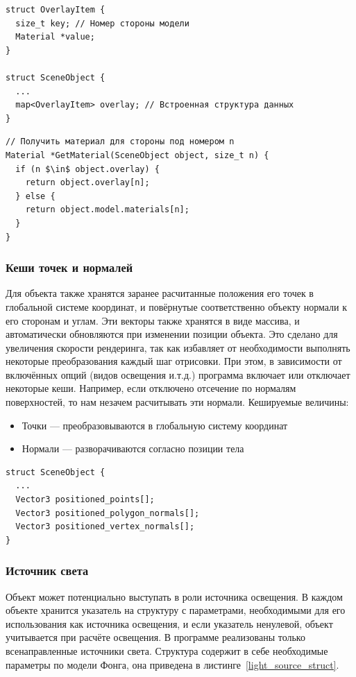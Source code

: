 \documentclass[a4paper,12pt]{report}
\numberwithin{equation}{section}
\begin{document}
\begin{lstlisting}[float=p,caption={Структура данных ``Оверлей материалов''},label=overlay_struct]
struct OverlayItem {
  size_t key; // Номер стороны модели
  Material *value;
}

struct SceneObject {
  ...
  map<OverlayItem> overlay; // Встроенная структура данных
}
\end{lstlisting}

\begin{lstlisting}[float=p,caption={Использование оверлея},label=overlay_use]
// Получить материал для стороны под номером n
Material *GetMaterial(SceneObject object, size_t n) {
  if (n $\in$ object.overlay) {
    return object.overlay[n];
  } else {
    return object.model.materials[n];
  }
}
\end{lstlisting}

\subsubsection{Кеши точек и нормалей}
Для объекта также хранятся заранее расчитанные положения его точек в глобальной системе координат, и повёрнутые соответственно объекту нормали к его сторонам и углам. Эти векторы также хранятся в виде массива, и автоматически обновляются при изменении позиции объекта. Это сделано для увеличения скорости рендеринга, так как избавляет от необходимости выполнять некоторые преобразования каждый шаг отрисовки. При этом, в зависимости от включённых опций (видов освещения и.т.д.) программа включает или отключает некоторые кеши. Например, если отключено отсечение по нормалям поверхностей, то нам незачем расчитывать эти нормали. Кешируемые величины:
\begin{itemize}
\item Точки --- преобразовываются в глобальную систему координат
\item Нормали --- разворачиваются согласно позиции тела
\end{itemize}

\begin{lstlisting}[float=p,caption={Поля кеша в структуре ``Объект на сцене''},label=object_cache_struct]
struct SceneObject {
  ...
  Vector3 positioned_points[];
  Vector3 positioned_polygon_normals[];
  Vector3 positioned_vertex_normals[];
}
\end{lstlisting}

\subsubsection{Источник света}
Объект может потенциально выступать в роли источника освещения. В каждом объекте хранится указатель на структуру с параметрами, необходимыми для его использования как источника освещения, и если указатель ненулевой, объект учитывается при расчёте освещения. В программе реализованы только всенаправленные источники света. Структура содержит в себе необходимые параметры по модели Фонга, она приведена в листинге~\ref{light_source_struct}.
\end{document}

